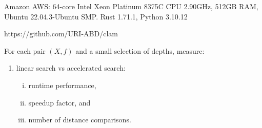 Amazon AWS: 64-core Intel Xeon Platinum 8375C CPU 2.90GHz, 512GB RAM, Ubuntu 22.04.3-Ubuntu SMP. Rust 1.71.1, Python 3.10.12

https://github.com/URI-ABD/clam

For each pair $(X, f)$ and a small selection of depths, measure:
\begin{enumerate}[1.]
    \item linear search vs accelerated search:
    \begin{enumerate}[i.]
        \item runtime performance,
        \item speedup factor, and
        \item number of distance comparisons.
    \end{enumerate}
\end{enumerate}

